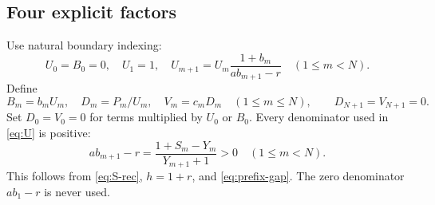 \documentclass[11pt]{article}
\numberwithin{equation}{section}
\theoremstyle{remark}
\begin{document}
\subsection{Four explicit factors}

Use natural boundary indexing:
\begin{equation}
U_0=B_0=0,\quad U_1=1,\quad
U_{m+1}=U_m\frac{1+b_m}{ab_{m+1}-r}\quad(1\leq m<N).
\label{eq:U}
\end{equation}
Define
\begin{equation}
B_m=b_mU_m,\quad D_m=P_m/U_m,\quad V_m=c_mD_m
\quad(1\leq m\leq N),\qquad D_{N+1}=V_{N+1}=0.
\label{eq:BDV}
\end{equation}
Set $D_0=V_0=0$ for terms multiplied by $U_0$ or $B_0$.
Every denominator used in \eqref{eq:U} is positive:
\begin{equation}
ab_{m+1}-r
=\frac{1+S_m-Y_m}{Y_{m+1}+1}>0
\quad(1\leq m<N).
\label{eq:denominator}
\end{equation}
This follows from \eqref{eq:S-rec}, $h=1+r$, and
\eqref{eq:prefix-gap}. The zero denominator $ab_1-r$ is never used.
\end{document}

